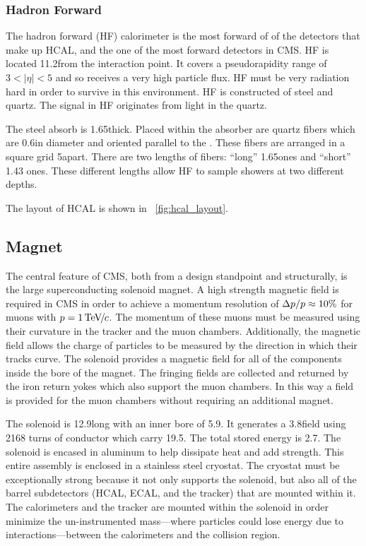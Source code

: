 \subsubsection{Hadron Forward}

The hadron forward (HF) calorimeter is the most forward of of the detectors
that make up HCAL, and the one of the most forward detectors in CMS. HF is
located 11.2\meters from the interaction point. It covers a pseudorapidity
range of $3 < |\eta| < 5$ and so receives a very high particle flux. HF must be
very radiation hard in order to survive in this environment. HF is constructed
of steel and quartz. The signal in HF originates from \Cherenkov light in the
quartz.

The steel absorb is 1.65\meters thick. Placed within the absorber are quartz
fibers which are 0.6\millimeters in diameter and oriented parallel to the
\zaxis. These fibers are arranged in a square grid 5\millimeters apart. There
are two lengths of fibers: ``long'' 1.65\meters ones and ``short'' 1.43\meters
ones. These different lengths allow HF to sample showers at two different
depths.

The layout of HCAL is shown in \FIG~\ref{fig:hcal_layout}.

\subsection{Magnet}

The central feature of CMS, both from a design standpoint and structurally, is
the large superconducting solenoid magnet. A high strength magnetic field is
required in CMS in order to achieve a momentum resolution of $\Delta p
/ p \approx 10\%$ for muons with $p = 1 {\,\text{Te\hspace{-.08em}V\hspace{-0.16em}/\hspace{-0.08em}}c}$. The momentum of
these muons must be measured using their curvature in the tracker and the muon
chambers. Additionally, the magnetic field allows the charge of particles to be
measured by the direction in which their tracks curve. The solenoid provides a
magnetic field for all of the components inside the bore of the magnet. The
fringing fields are collected and returned by the iron return yokes which also
support the muon chambers. In this way a field is provided for the muon
chambers without requiring an additional magnet.

The solenoid is 12.9\meters long with an inner bore of 5.9\meters. It generates
a 3.8\tesla field using 2168 turns of conductor which carry 19.5\kiloamps. The
total stored energy is 2.7\gigajoules. The solenoid is encased in aluminum to
help dissipate heat and add strength. This entire assembly is enclosed in a
stainless steel cryostat. The cryostat must be exceptionally strong because it
not only supports the solenoid, but also all of the barrel subdetectors (HCAL,
ECAL, and the tracker) that are mounted within it. The calorimeters and the
tracker are mounted within the solenoid in order minimize the un-instrumented
mass---where particles could lose energy due to interactions---between the
calorimeters and the collision region.


